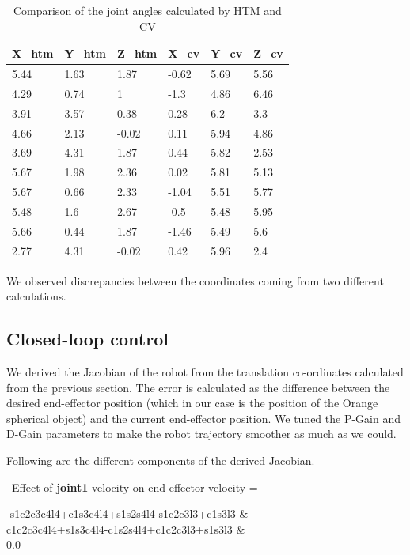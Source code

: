 \documentclass[11pt]{article}
\begin{document}
\begin{table}[h]
\centering
\begin{tabular}{|l|l|l|l|l|l|}
X\_htm & Y\_htm & Z\_htm & X\_cv & Y\_cv & Z\_cv  \\\hline
5.44   & 1.63   & 1.87   & -0.62 & 5.69  & 5.56   \\\hline
4.29   & 0.74   & 1      & -1.3  & 4.86  & 6.46   \\\hline
3.91   & 3.57   & 0.38   & 0.28  & 6.2   & 3.3    \\\hline
4.66   & 2.13   & -0.02  & 0.11  & 5.94  & 4.86   \\\hline
3.69   & 4.31   & 1.87   & 0.44  & 5.82  & 2.53   \\\hline
5.67   & 1.98   & 2.36   & 0.02  & 5.81  & 5.13   \\\hline
5.67   & 0.66   & 2.33   & -1.04 & 5.51  & 5.77   \\\hline
5.48   & 1.6    & 2.67   & -0.5  & 5.48  & 5.95   \\\hline
5.66   & 0.44   & 1.87   & -1.46 & 5.49  & 5.6    \\\hline
2.77   & 4.31   & -0.02  & 0.42  & 5.96  & 2.4    \\\hline
\end{tabular}
\caption{Comparison of the joint angles calculated by HTM and CV}
\end{table}

We observed discrepancies between the coordinates coming from two different calculations.

\subsection{Closed-loop control}

We derived the Jacobian of the robot from the translation co-ordinates calculated from the previous section. The error is calculated as the difference between the desired end-effector position (which in our case is the position of the Orange spherical object) and the current end-effector position. We tuned the P-Gain and D-Gain parameters to make the robot trajectory smoother as much as we could.

Following are the different components of the derived Jacobian.

\
Effect of \textbf{joint1} velocity on end-effector velocity
=
\begin{bmatrix}
-s1c2c3c4l4+c1s3c4l4+s1s2s4l4-s1c2c3l3+c1s3l3 & \\
c1c2c3c4l4+s1s3c4l4-c1s2s4l4+c1c2c3l3+s1s3l3 & \\
0.0
\end{bmatrix}
\
\end{document}
